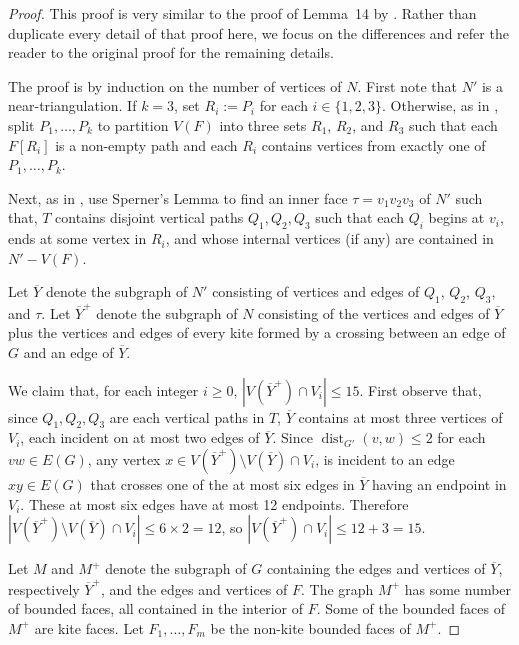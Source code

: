 \documentclass{patmorin}
\DeclareMathOperator{\dist}{dist}
\renewcommand{\ge}{\geqslant}
\renewcommand{\le}{\leqslant}
\begin{document}
\begin{proof}
  This proof is very similar to the proof of Lemma~14 by \citet{dujmovic.joret.ea:planar}. Rather than duplicate every detail of that proof here, we focus on the differences and refer the reader to the original proof for the remaining details.
  
  The proof is by induction on the number of vertices of $N$.
  First note that $N'$ is a near-triangulation.  If $k=3$, set $R_i := P_i$ for each $i\in\{1,2,3\}$.  Otherwise, as in \citep{dujmovic.joret.ea:planar}, split $P_1,\ldots,P_k$ to partition $V(F)$ into three sets $R_1$, $R_2$, and $R_3$ such that each $F[R_i]$ is a non-empty path and each $R_i$ contains vertices from exactly one of $P_1,\ldots,P_k$. 
  
  Next, as in \citep{dujmovic.joret.ea:planar}, use Sperner's Lemma to find an inner face $\tau=v_1v_2v_3$ of $N'$ such that, $T$ contains disjoint vertical paths $Q_1,Q_2,Q_3$ such that each $Q_i$ begins at $v_i$, ends at some vertex in $R_i$, and whose internal vertices (if any) are contained in $N'-V(F)$.
  
  Let $\overline{Y}$ denote the subgraph of $N'$ consisting of vertices and edges of $Q_1$, $Q_2$, $Q_3$, and $\tau$.  Let $\overline{Y}^+$ denote the subgraph of $N$ consisting of the vertices and edges of $\overline{Y}$ plus the vertices and edges of every kite formed by a crossing between an edge of $G$ and an edge of $\overline{Y}$.
  
  We claim that, for each integer $i\ge 0$, $|V(\overline{Y}^+)\cap V_i|\le 15$.  First observe that, since $Q_1,Q_2,Q_3$ are each vertical paths in $T$,  $\overline{Y}$ contains at most three vertices of $V_i$, each incident on at most two edges of $\overline{Y}$.  Since $\dist_{G'}(v,w)\le 2$ for each $vw\in E(G)$, any vertex $x\in V(\overline{Y}^+)\setminus V(\overline{Y})\cap V_i$, is incident to an edge $xy\in E(G)$ that crosses one of the at most six edges in $\overline{Y}$ having an endpoint in $V_i$.  These at most six edges have at most 12 endpoints.  Therefore $|V(\overline{Y}^+)\setminus V(\overline{Y})\cap V_i|\le 6\times 2=12$, so $|V(\overline{Y}^+)\cap V_i|\le 12+3=15$.
  
  Let $M$ and $M^+$ denote the subgraph of $G$ containing the edges and vertices of $\overline{Y}$, respectively $\overline{Y}^+$, and the edges and vertices of $F$.  The graph $M^+$ has some number of bounded faces, all contained in the interior of $F$. Some of the bounded faces of $M^+$ are kite faces. Let $F_1,\ldots,F_m$ be the non-kite bounded faces of $M^+$.  
  

\end{proof}
\end{document}

